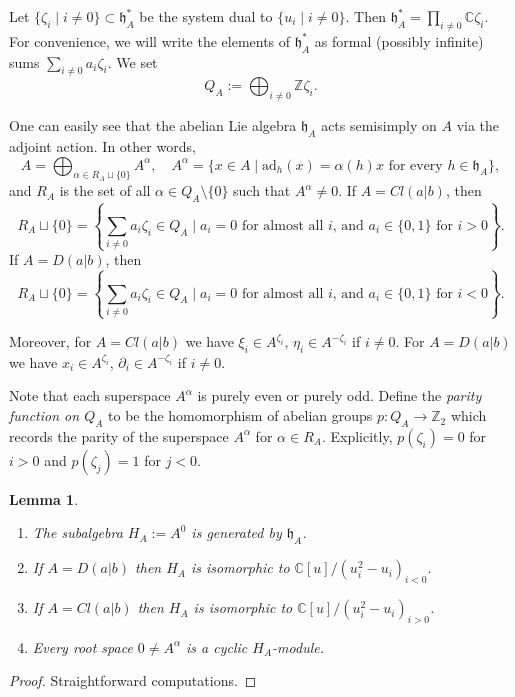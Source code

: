 \documentclass[12pt]{amsart}
\theoremstyle{plain} %
\numberwithin{equation}{section}
\theoremstyle{definition}
\theoremstyle{remark}
\theoremstyle{plain} %
\newtheorem{lemma}[definition]{Lemma}
\newcommand{\ad}{\mathrm{ad}}
\newcommand{\C}{\mathbb{C}}
\newcommand{\gh}{\mathfrak{h}}
\def\gh{\mathfrak{h}}
\begin{document}
Let $\{\zeta_i \; | \; i \neq 0\}\subset\gh_A^*$ be the system dual to $\{u_i \; | \; i \neq 0 \}$. 
                Then $\gh_A^* = \prod_{i \neq 0} \C \zeta_i$. For convenience, we will write the elements of $\gh_A^*$ as formal (possibly infinite) sums  $\sum_{i \neq 0}a_i \zeta_i $.
  We set  $$Q_A:=\bigoplus_{i \neq 0} \mathbb Z \zeta_i.$$ 
 
  One can easily see that the abelian Lie algebra $\gh_A$ acts semisimply on $A$ via the adjoint action.  In other words, 
     $$A= \bigoplus_{\alpha\in R_A \sqcup \{ 0 \} } A^\alpha,\quad A^\alpha=\{x\in A\mid \ad_h(x)=\alpha(h)x \mbox{ for every } h \in \gh_A\},$$
      and $R_A$ is the set of all $\alpha \in Q_A \setminus \{ 0 \}$ such that $A^{\alpha} \neq 0$.          
       If $A =Cl(a|b)$, then   $$R_A \sqcup \{ 0\}= \left\{ \sum_{i \neq 0} a_i \zeta_i \in Q_A \; |\; a_i=0 \mbox{ for almost all $i$, and }a_i\in \{0,1 \} \mbox{ for } i > 0   \right\}.$$
       If $A =D(a|b)$,   then $$R_A \sqcup \{ 0\}= \left\{ \sum_{i\neq 0} a_i \zeta_i \in Q_A \; |\; a_i=0 \mbox{ for almost all $i$, and }a_i\in \{0,1 \} \mbox{ for } i < 0   \right\}.$$

    
      
     Moreover, for  $A = Cl(a|b)$ we have $\xi_i \in A^{\zeta_i}$, $\eta_i \in A^{-\zeta_i}$ if $i \neq 0$. For $A = D(a|b)$ we have  $x_i \in A^{\zeta_{i}}$, $\partial_i \in A^{-\zeta_{i}}$ if $i\neq 0$.

   Note that each superspace $A^\alpha$  is purely even or purely odd.  Define the \emph{parity function on $Q_A$} to be the homomorphism of abelian groups $p:Q_A\to\mathbb Z_2 $ which records the parity of the superspace $A^\alpha$ for $\alpha \in R_{A}$. 
Explicitly, 
      $p(\zeta_i)=0$ for $i>0$ and $p(\zeta_j)=1$ for  $j<0$.
   
   

     
      \begin{lemma}\label{rootsA} \begin{enumerate}
        \item[(a)]  The subalgebra $H_A:=A^0$ is generated by $\gh_A$.
        \item[(b)] If $A=D(a|b)$ then $H_A$ is isomorphic to $\mathbb C[u]/(u_i^2-u_i)_{i<0}$.
        \item[(c)]  If $A=Cl(a|b)$ then $H_A$ is isomorphic to $\mathbb C[u]/(u_i^2-u_i)_{i > 0}$.
          \item[(d)] Every  root space $0\neq A^{\alpha}$ is a cyclic $H_A$-module.
          \end{enumerate}
        \end{lemma}
        \begin{proof} Straightforward computations.
        \end{proof}
\end{document}
